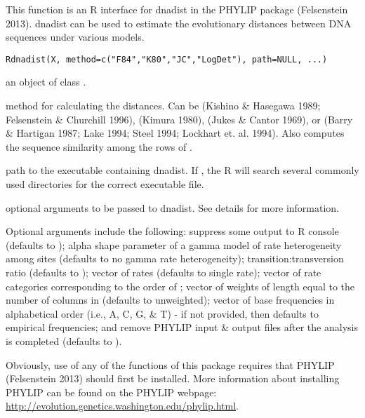 \documentclass[a4paper]{book}
\begin{document}
%
\begin{Description}\relax
This function is an R interface for dnadist in the PHYLIP package (Felsenstein 2013). dnadist can be used to estimate the evolutionary distances between DNA sequences under various models.
\end{Description}
%
\begin{Usage}
\begin{verbatim}
Rdnadist(X, method=c("F84","K80","JC","LogDet"), path=NULL, ...)
\end{verbatim}
\end{Usage}
%
\begin{Arguments}
\begin{ldescription}
\item[\code{X}] an object of class .
\item[\code{method}] method for calculating the distances. Can be  (Kishino \& Hasegawa 1989; Felsenstein \& Churchill 1996),  (Kimura 1980),  (Jukes \& Cantor 1969), or  (Barry \& Hartigan 1987; Lake 1994; Steel 1994; Lockhart et. al. 1994). Also  computes the sequence similarity among the rows of .
\item[\code{path}] path to the executable containing dnadist. If , the R will search several commonly used directories for the correct executable file.
\item[\code{...}] optional arguments to be passed to dnadist. See details for more information.
\end{ldescription}
\end{Arguments}
%
\begin{Details}\relax
Optional arguments include the following:  suppress some output to R console (defaults to );  alpha shape parameter of a gamma model of rate heterogeneity among sites (defaults to no gamma rate heterogeneity);  transition:transversion ratio (defaults to );  vector of rates (defaults to single rate);  vector of rate categories corresponding to the order of ;  vector of weights of length equal to the number of columns in  (defaults to unweighted);  vector of base frequencies in alphabetical order (i.e., A, C, G, \& T) - if not provided, then defaults to empirical frequencies; and  remove PHYLIP input \& output files after the analysis is completed (defaults to ).

Obviously, use of any of the functions of this package requires that PHYLIP (Felsenstein 2013) should first be installed. More information about installing PHYLIP can be found on the PHYLIP webpage: \url{http://evolution.genetics.washington.edu/phylip.html}.
\end{Details}
\end{document}
